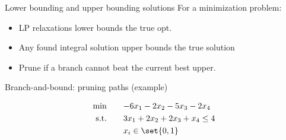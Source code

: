 \documentclass[aspectratio=169, handout]{beamer}
\begin{document}
\begin{frame}{Lower bounding and upper bounding solutions}
    For a minimization problem:

    \begin{itemize}[<+->]
        \item LP relaxations lower bounds the true opt.
        \item Any found integral solution upper bounds the true solution
        \item Prune if a branch cannot beat the current best upper.
    \end{itemize}
\end{frame}

\begin{frame}{Branch-and-bound: pruning paths (example)}

    \begin{align*}
        \min \qquad        & {-6x_1} - 2x_2 - 5x_3 - 2x_4   \\
        \text{s.t.} \qquad & 3x_1 + 2x_2 + 2x_3 + x_4 \le 4 \\
                           & x_i \in \set{0, 1}
    \end{align*}
\end{frame}
\end{document}
